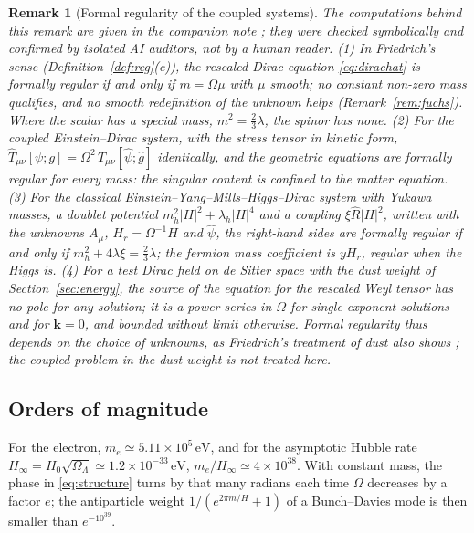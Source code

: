 \documentclass[11pt,a4paper]{article}
\newtheorem{remark}{Remark}
\theoremstyle{definition}
\newcommand{\hg}{\hat g}
\newcommand{\hpsi}{\hat\psi}
\begin{document}
\begin{remark}[Formal regularity of the coupled systems]
\label{rem:friedrich}
The computations behind this remark are given in the companion note \cite{Companion}; they were checked symbolically and confirmed by isolated AI auditors, not by a human reader. (1) In Friedrich's sense (Definition~\ref{def:reg}(c)), the rescaled Dirac equation \eqref{eq:dirachat} is formally regular if and only if $m=\Omega\mu$ with $\mu$ smooth; no constant non-zero mass qualifies, and no smooth redefinition of the unknown helps (Remark~\ref{rem:fuchs}). Where the scalar has a special mass, $m^{2}=\tfrac23\lambda$, the spinor has none. (2) For the coupled Einstein--Dirac system, with the stress tensor in kinetic form, $\hat T_{\mu\nu}[\psi;g]=\Omega^{2}\,T_{\mu\nu}[\hpsi;\hg]$ identically, and the geometric equations are formally regular for every mass: the singular content is confined to the matter equation. (3) For the classical Einstein--Yang--Mills--Higgs--Dirac system with Yukawa masses, a doublet potential $m_{h}^{2}|H|^{2}+\lambda_{h}|H|^{4}$ and a coupling $\xi\hat R|H|^{2}$, written with the unknowns $A_{\mu}$, $H_{r}=\Omega^{-1}H$ and $\hpsi$, the right-hand sides are formally regular if and only if $m_{h}^{2}+4\lambda\xi=\tfrac23\lambda$; the fermion mass coefficient is $y H_{r}$, regular when the Higgs is. (4) For a test Dirac field on de Sitter space with the dust weight of Section~\ref{sec:energy}, the source of the equation for the rescaled Weyl tensor has no pole for any solution; it is a power series in $\Omega$ for single-exponent solutions and for $\mathbf{k}=0$, and bounded without limit otherwise. Formal regularity thus depends on the choice of unknowns, as Friedrich's treatment of dust also shows \cite{Friedrich2017}; the coupled problem in the dust weight is not treated here.
\end{remark}

\subsection{Orders of magnitude}

For the electron, $m_{e}\simeq5.11\times10^{5}\,\mathrm{eV}$, and for the asymptotic Hubble rate $H_{\infty}=H_{0}\sqrt{\Omega_{\Lambda}}\simeq1.2\times10^{-33}\,\mathrm{eV}$, $m_{e}/H_{\infty}\simeq4\times10^{38}$. With constant mass, the phase in \eqref{eq:structure} turns by that many radians each time $\Omega$ decreases by a factor $e$; the antiparticle weight $1/(e^{2\pi m/H}+1)$ of a Bunch--Davies mode is then smaller than $e^{-10^{39}}$.
\end{document}
